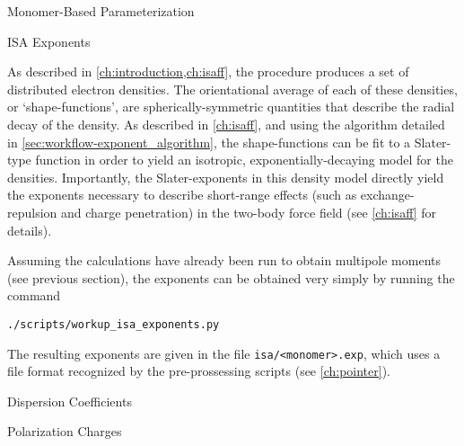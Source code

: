 \begin{section}{Monomer-Based Parameterization}
\begin{subsection}{ISA Exponents}

As described in \cref{ch:introduction,ch:isaff}, the \isa procedure
produces a set of distributed \aim electron densities. The
orientational average of each of these \aim densities, or
`shape-functions', are spherically-symmetric quantities that describe the
radial decay of the \aim density.\cite{Misquitta2014} As described in
\cref{ch:isaff}, and using the algorithm detailed in 
\cref{sec:workflow-exponent_algorithm},
the shape-functions can be fit to a Slater-type function in
order to yield an isotropic, exponentially-decaying model for the \isa
densities. Importantly, the Slater-exponents in this density model directly
yield the exponents necessary to describe short-range effects (such as
exchange-repulsion and charge penetration) in the two-body force
field (see \cref{ch:isaff} for details).

Assuming the \isa calculations have already been run to obtain multipole
moments (see previous section), the \isa exponents can be obtained very simply
by running the command
%
\begin{lstlisting}
./scripts/workup_isa_exponents.py
\end{lstlisting}
%
The resulting exponents are given in the file \verb|isa/<monomer>.exp|, which
uses a file format recognized by the \pointer pre-prossessing scripts (see
\cref{ch:pointer}).

\end{subsection}


\begin{subsection}{Dispersion Coefficients}
\label{sec:workflow-dispersion}



\end{subsection}

\begin{subsection}{Polarization Charges}
\label{sec:workflow-polarizabilities}



\end{subsection}

\end{section}
